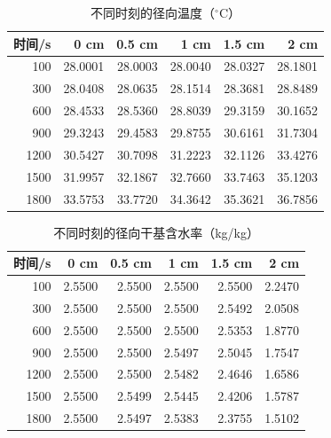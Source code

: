 \begin{table}[htbp]
\centering
\caption{不同时刻的径向温度（$^\circ$C）}
\label{tab:q1_temperature}
\begin{tabular}{rrrrrr}
\toprule
时间/s & 0 cm & 0.5 cm & 1 cm & 1.5 cm & 2 cm \\
\midrule
100 & 28.0001 & 28.0003 & 28.0040 & 28.0327 & 28.1801 \\
300 & 28.0408 & 28.0635 & 28.1514 & 28.3681 & 28.8489 \\
600 & 28.4533 & 28.5360 & 28.8039 & 29.3159 & 30.1652 \\
900 & 29.3243 & 29.4583 & 29.8755 & 30.6161 & 31.7304 \\
1200 & 30.5427 & 30.7098 & 31.2223 & 32.1126 & 33.4276 \\
1500 & 31.9957 & 32.1867 & 32.7660 & 33.7463 & 35.1203 \\
1800 & 33.5753 & 33.7720 & 34.3642 & 35.3621 & 36.7856 \\
\bottomrule
\end{tabular}
\end{table}

\begin{table}[htbp]
\centering
\caption{不同时刻的径向干基含水率（kg/kg）}
\label{tab:q1_moisture}
\begin{tabular}{rrrrrr}
\toprule
时间/s & 0 cm & 0.5 cm & 1 cm & 1.5 cm & 2 cm \\
\midrule
100 & 2.5500 & 2.5500 & 2.5500 & 2.5500 & 2.2470 \\
300 & 2.5500 & 2.5500 & 2.5500 & 2.5492 & 2.0508 \\
600 & 2.5500 & 2.5500 & 2.5500 & 2.5353 & 1.8770 \\
900 & 2.5500 & 2.5500 & 2.5497 & 2.5045 & 1.7547 \\
1200 & 2.5500 & 2.5500 & 2.5482 & 2.4646 & 1.6586 \\
1500 & 2.5500 & 2.5499 & 2.5445 & 2.4206 & 1.5787 \\
1800 & 2.5500 & 2.5497 & 2.5383 & 2.3755 & 1.5102 \\
\bottomrule
\end{tabular}
\end{table}
